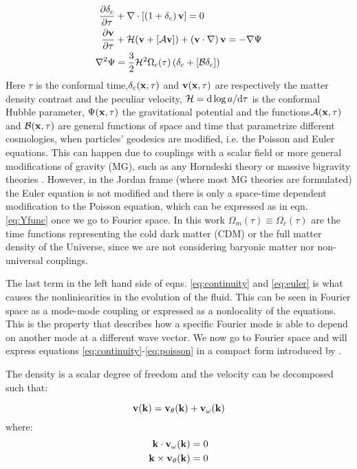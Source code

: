 \begin{align}
\frac{\partial\delta_{c}}{\partial\tau} & +\nabla\cdot\left[\left(1+\delta_{c}\right)\mathbf{v}\right]=0\label{eq:continuity}\\
\frac{\partial\mathbf{v}}{\partial\tau} & +\mathcal{H}(\mathbf{v}+\left[\mathcal{A}\mathbf{v}\right])+\left(\mathbf{v}\cdot\nabla\right)\mathbf{v}=-\nabla\Psi\label{eq:euler}\\
\nabla^{2}\Psi & =\frac{3}{2}\mathcal{H}^{2}\Omega_{c}(\tau)\left(\delta_{c}+\left[\mathcal{B}\delta_{c}\right]\right)\label{eq:poisson}
\end{align}
Here $\tau$ is the conformal time,$\delta_{c}(\mathbf{x},\tau)$ and $\mathbf{v}(\mathbf{x},\tau)$
are respectively the matter density contrast and the peculiar velocity,
$\mathcal{H}=\mathrm{d}\log a/\mathrm{d}\tau$ is the conformal Hubble parameter, $\Psi(\mathbf{x},\tau)$
the gravitational potential and the functions$\mathcal{A}(\mathbf{x},\tau)$
and $\mathcal{B}(\mathbf{x},\tau)$ are general functions of space and
time that parametrize different cosmologies, when particles' geodesics
are modified, i.e. the Poisson and Euler equations. This can happen
due to couplings with a scalar field or more general modifications
of gravity (MG), such as any Horndeski theory or massive bigravity
theories \cite{amendola_observables_2012}. However, in the Jordan
frame (where most MG theories are formulated) the Euler equation is
not modified and there is only a space-time dependent modification
to the Poisson equation, which can be expressed as in eqn. \ref{eq:Yfunc}
once we go to Fourier space. In this work $\Omega_{m}(\tau)$$\equiv$$\Omega_{c}(\tau)$
are the time functions representing the cold dark matter (CDM) or
the full matter density of the Universe, since we are not considering
baryonic matter nor non-universal couplings.

The last term in the left hand side of eqns. \ref{eq:continuity}
and \ref{eq:euler} is what causes the nonliniearities in the evolution
of the fluid. This can be seen in Fourier space as a mode-mode coupling
or expressed as a nonlocality of the equations. This is the property
that describes how a specific Fourier mode is able to depend on another
mode at a different wave vector. We now go to Fourier space and will
express equations \ref{eq:continuity}-\ref{eq:poisson} in a compact
form introduced by \cite{scoccimarro_new_2000}.

The density is a scalar degree of freedom and the velocity can be
decomposed such that:

\begin{equation}
\mathbf{v}(\mathbf{k})=\mathbf{v}_{\theta}(\mathbf{k})+\mathbf{v{}_{\omega}}(\mathbf{k})
\end{equation}
where: 
\begin{align*}
\mathbf{k}\cdot\mathbf{v_{\omega}}(\mathbf{k}) & =0\\
\mathbf{k}\times\mathbf{v_{\theta}}(\mathbf{k}) & =0
\end{align*}


